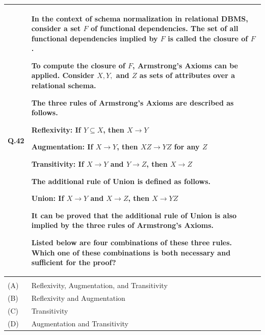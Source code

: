 \documentclass[14pt]{article}
\begin{document}
\begin{tabular}{|p{1.5cm}|p{12cm}|}
\hline

Q.42 &
\parbox[t]{\linewidth}{
\strut
In the context of schema normalization in relational DBMS, consider a set
$F$ of functional dependencies. The set of all functional dependencies
implied by $F$ is called the closure of $F$.

To compute the closure of $F$, Armstrong's Axioms can be applied.
Consider $X,Y,$ and $Z$ as sets of attributes over a relational schema.

The three rules of Armstrong's Axioms are described as follows.

\vspace{0.15cm}

Reflexivity: If $Y\subseteq X$, then $X\rightarrow Y$

Augmentation: If $X\rightarrow Y$, then $XZ\rightarrow YZ$ for any $Z$

Transitivity: If $X\rightarrow Y$ and $Y\rightarrow Z$, then $X\rightarrow Z$

\vspace{0.15cm}

The additional rule of Union is defined as follows.

Union: If $X\rightarrow Y$ and $X\rightarrow Z$, then $X\rightarrow YZ$

\vspace{0.15cm}

It can be proved that the additional rule of Union is also implied
by the three rules of Armstrong's Axioms.

Listed below are four combinations of these three rules. Which one of
these combinations is both necessary and sufficient for the proof?

\vspace{0.35cm}
}
\\
\hline

& \\[-0.2cm]
\hline

(A) & Reflexivity, Augmentation, and Transitivity \\[0.25cm]
\hline

(B) & Reflexivity and Augmentation \\[0.25cm]
\hline

(C) & Transitivity \\[0.25cm]
\hline

(D) & Augmentation and Transitivity \\[0.25cm]
\hline

\end{tabular}
\end{document}
